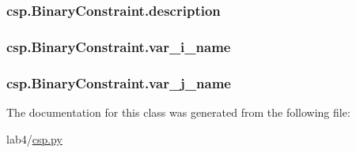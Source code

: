 \subsubsection[{description}]{\setlength{\rightskip}{0pt plus 5cm}csp.\+Binary\+Constraint.\+description}\label{classcsp_1_1_binary_constraint_aaab7a705fdfae23b58a5346d3c846f12}
\hypertarget{classcsp_1_1_binary_constraint_aa951bc2855e453270f5f28ba829636c5}{}
\subsubsection[{var\+\_\+i\+\_\+name}]{\setlength{\rightskip}{0pt plus 5cm}csp.\+Binary\+Constraint.\+var\+\_\+i\+\_\+name}\label{classcsp_1_1_binary_constraint_aa951bc2855e453270f5f28ba829636c5}
\hypertarget{classcsp_1_1_binary_constraint_a4e917e6acb014116c86a11aa94f98757}{}
\subsubsection[{var\+\_\+j\+\_\+name}]{\setlength{\rightskip}{0pt plus 5cm}csp.\+Binary\+Constraint.\+var\+\_\+j\+\_\+name}\label{classcsp_1_1_binary_constraint_a4e917e6acb014116c86a11aa94f98757}


The documentation for this class was generated from the following file\+:\begin{DoxyCompactItemize}
\item 
lab4/\hyperlink{csp_8py}{csp.\+py}\end{DoxyCompactItemize}
